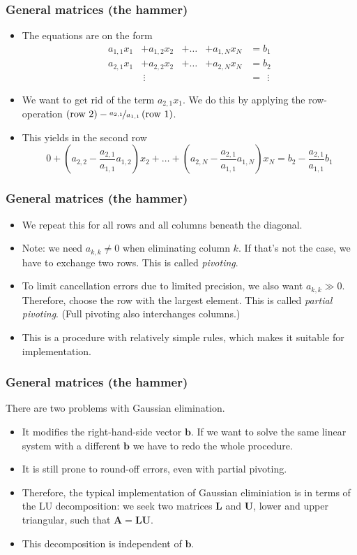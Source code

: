 \begin{frame}
  \frametitle{General matrices (the hammer)}
  \begin{itemize}
  \item The equations are on the form
    \[
      \begin{aligned}
        a_{1,1}x_1 &+ a_{1,2}x_2 &+ \ldots & +a_{1,N}x_N &= b_1 \\
        a_{2,1}x_1 &+ a_{2,2}x_2 &+ \ldots & +a_{2,N}x_N &= b_2 \\
        &\ \vdots  & & &=\ \ \vdots
      \end{aligned}
    \]
  \item We want to get rid of the term $a_{2,1}x_1$. We do this by applying the
    row-operation
    $\left(\text{row 2}\right)-\nicefrac{a_{2,1}}{a_{1,1}}\left(\text{row 1}\right)$.
  \item This yields in the second row
    \[
      0 + \left( a_{2,2} - \frac{a_{2,1}}{a_{1,1}} a_{1,2} \right) x_2 + \ldots
      + \left( a_{2,N} - \frac{a_{2,1}}{a_{1,1}}a_{1,N} \right) x_N
      = b_2 - \frac{a_{2,1}}{a_{1,1}} b_1
    \]
  \end{itemize}
\end{frame}

\begin{frame}
  \frametitle{General matrices (the hammer)}
  \begin{itemize}
  \item We repeat this for all rows and all columns beneath the diagonal.
  \item Note: we need $a_{k,k} \not= 0$ when eliminating column $k$. If that's
    not the case, we have to exchange two rows. This is called \emph{pivoting}.
  \item To limit cancellation errors due to limited precision, we also want
    $a_{k,k} \gg 0$. Therefore, choose the row with the largest element. This is
    called \emph{partial pivoting}. (Full pivoting also interchanges columns.)
  \item This is a procedure with relatively simple rules, which makes it
    suitable for implementation.
  \end{itemize}
\end{frame}

\begin{frame}
  \frametitle{General matrices (the hammer)}
  There are two problems with Gaussian elimination.
  \begin{itemize}
  \item It modifies the right-hand-side vector $\bm b$. If we want to solve the
    same linear system with a different $\bm b$ we have to redo the whole
    procedure.
  \item It is still prone to round-off errors, even with partial pivoting.
  \item Therefore, the typical implementation of Gaussian eliminiation is in
    terms of the LU decomposition: we seek two matrices $\bm L$ and $\bm U$,
    lower and upper triangular, such that $\bm A = \bm L \bm U$.
  \item This decomposition is independent of $\bm b$.
  \end{itemize}
\end{frame}

